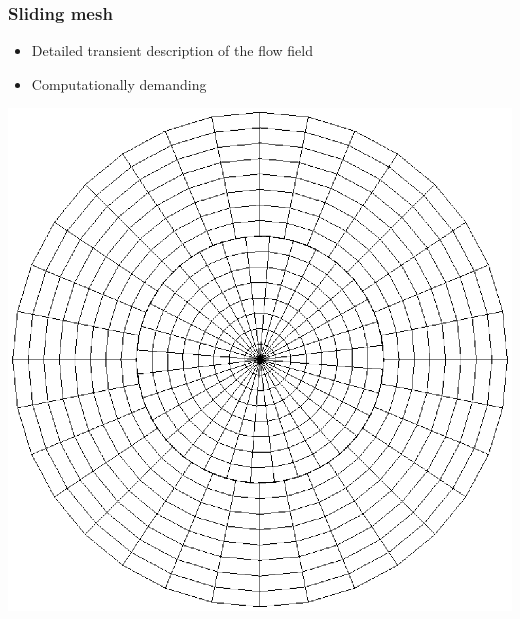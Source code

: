 \documentclass[10pt,xcolor=dvipsnames]{beamer}
\begin{document}
\begin{frame}[t]
\frametitle{Sliding mesh}
\vspace*{1cm}
\begin{minipage}{\columnwidth}
\begin{minipage}{0.49\columnwidth}
  \begin{itemize}
   \item Detailed transient description of the flow field
  \end{itemize}
  \begin{itemize}
    \item Computationally demanding
  \end{itemize}
\end{minipage}
\begin{minipage}{0.5\columnwidth}
{\includegraphics[width=\columnwidth]{slidingMesh}}
\end{minipage}
\end{minipage}



\end{frame}
\end{document}
